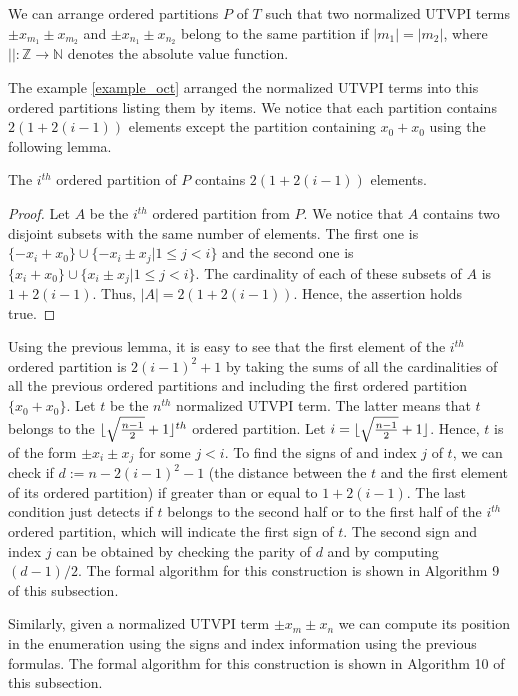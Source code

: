 We can arrange ordered partitions $P$ of $T$ such 
that two normalized UTVPI terms $\pm x_{m_1} \pm x_{m_2}$
and $\pm x_{n_1} \pm x_{n_2}$ belong to the same 
partition if $|m_1| = |m_2|$, where 
$|| : \mathbb{Z} \rightarrow \mathbb{N}$ denotes
the absolute value function.

The example \ref{example_oct} arranged the normalized 
UTVPI terms into this ordered partitions listing them
by items. We notice that each partition
contains $2(1 + 2(i-1))$ elements except the
partition containing $x_0 + x_0$ using the 
following lemma.

\begin{lemma}
  The $i^{th}$ ordered partition of $P$ contains 
  $2(1 + 2(i-1))$ elements.
\end{lemma}

\begin{proof}
  Let $A$ be the $i^{th}$ ordered partition from 
  $P$. We notice that $A$ contains two
  disjoint subsets with the same number of elements.
  The first one is $\{-x_i + x_0\} \cup 
  \{-x_i \pm x_j | 1 \leq j < i \}$
  and the second one is 
  $\{x_i + x_0\} \cup \{x_i \pm x_j | 1 \leq j < i \}$.
  The cardinality of each of these subsets of $A$
  is $1 + 2(i-1)$. Thus, $|A| = 2(1 + 2(i-1))$. Hence,
  the assertion holds true.
\end{proof}

Using the previous lemma, it is easy to see
that the first element of the $i^{th}$ ordered partition 
is $2(i-1)^2 + 1$ by taking the sums of all the 
cardinalities of all the previous ordered partitions
and including the first ordered partition 
$\{ x_0 + x_0 \}$. Let $t$ be the $n^{th}$ normalized 
UTVPI term. The latter means that $t$ belongs
to the 
$\lfloor \sqrt{\frac{n-1}{2}} + 1 \rfloor^{th}$ ordered 
partition. Let $i = \lfloor \sqrt{\frac{n-1}{2}} + 1 \rfloor$.
Hence, $t$ is
of the form $\pm x_i \pm x_j$ for some $j < i$.
To find the signs of and index $j$ of $t$, 
we can check if $d := n - 2(i-1)^2 -1$ 
(the distance between the $t$ and the
first element of its ordered partition) 
if greater than or equal to $1 + 2(i-1)$. The last 
condition just detects if $t$ belongs to the second
half or to the first half of the $i^{th}$ ordered
partition, which will indicate the first sign of $t$.
The second sign and index $j$ can be obtained by checking
the parity of $d$ and by computing $(d-1)/2$.
The formal algorithm for this construction is shown in Algorithm 9 of 
this subsection. 

Similarly, given a normalized UTVPI term $\pm x_m \pm x_n$
we can compute its position in the enumeration using the
signs and index information using the previous formulas.
The formal algorithm for this construction is shown in Algorithm 10
of this subsection.

